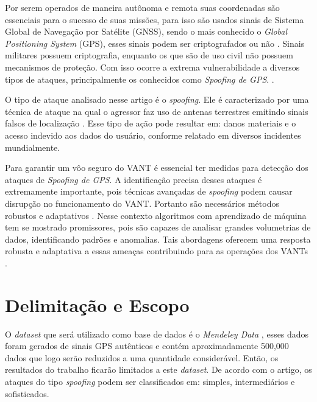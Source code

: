\documentclass[12pt]{article}
\begin{document}
Por serem operados de maneira autônoma e remota suas coordenadas são essenciais
para o sucesso de suas missões, para isso são usados sinais de Sistema Global de Navegação por Satélite (GNSS),
sendo o mais conhecido o \textit{Global Positioning System} (GPS), esses sinais podem ser criptografados ou não
\cite {lester}. Sinais militares possuem criptografia, enquanto os que são de uso civil não possuem mecanismos de proteção.
Com isso ocorre a extrema vulnerabilidade a diversos tipos de ataques, principalmente os conhecidos como \textit{Spoofing de GPS}.
\cite{srinivasansGPSSpoofingDetection2023}.

O tipo de ataque analisado nesse artigo é o \textit{spoofing}. 
Ele é caracterizado por uma técnica de ataque na qual o agressor faz uso de antenas terrestres emitindo sinais falsos
de localização \cite {Spoofing}.
Esse tipo de ação pode resultar em: danos materiais e o acesso indevido aos dados do usuário,
conforme relatado em diversos incidentes mundialmente.
\cite{g1drone2022a,g1drone2022b,bandnews2022,bemparana2022,veja2022,forbes2020,australianaviation2022}

Para garantir um vôo seguro do VANT é essencial ter medidas para detecção dos ataques de \textit{Spoofing de GPS}.
A identificação precisa desses ataques é extremamente importante, pois técnicas avançadas de \textit{spoofing}
podem causar disrupção no funcionamento do VANT. Portanto são necessários métodos robustos e adaptativos \cite{isleyenGPSSpoofingDetection2024}.
Nesse contexto algoritmos com aprendizado de máquina tem se mostrado promissores, pois são capazes de analisar
grandes volumetrias de dados, identificando padrões e anomalias. Tais abordagens oferecem uma resposta robusta e adaptativa a essas ameaças contribuindo para as operações dos VANTs  \cite[tradução nossa]{isleyenGPSSpoofingDetection2024}.


\section{Delimitação e Escopo}
O \textit{dataset} que será utilizado como base de dados é o \textit{Mendeley Data} 
\cite{aissou2022dataset}, esses dados foram gerados de sinais GPS autênticos e 
contém aproximadamente 500,000 dados que logo serão reduzidos a uma quantidade
considerável. Então, os resultados do trabalho ficarão
limitados a este \textit{dataset}. De acordo com o artigo, os ataques do tipo \textit{spoofing} podem ser classificados em: simples, intermediários e sofisticados.
\end{document}
